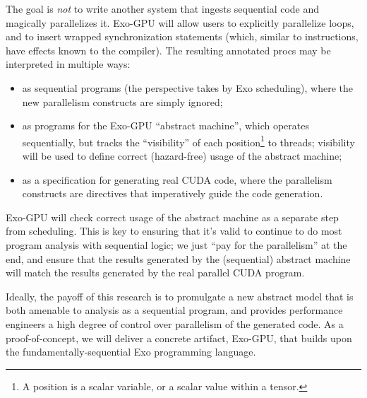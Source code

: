 \filbreak
The goal is \textit{not} to write another system that ingests sequential code and magically parallelizes it.
Exo-GPU will allow users to explicitly parallelize loops, and to insert wrapped synchronization statements (which, similar to instructions, have effects known to the compiler).
The resulting annotated procs may be interpreted in multiple ways:

\begin{itemize}
  \item as sequential programs (the perspective takes by Exo scheduling), where the new parallelism constructs are simply ignored;
  \item as programs for the Exo-GPU ``abstract machine'', which operates sequentially, but tracks the ``visibility'' of each position\footnote{A position is a scalar variable, or a scalar value within a tensor.} to threads;
  visibility will be used to define correct (hazard-free) usage of the abstract machine;
  \item as a specification for generating real CUDA code, where the parallelism constructs are directives that imperatively guide the code generation.
\end{itemize}

\filbreak
Exo-GPU will check correct usage of the abstract machine as a separate step from scheduling.
This is key to ensuring that it's valid to continue to do most program analysis with sequential logic; we just ``pay for the parallelism'' at the end, and ensure that the results generated by the (sequential) abstract machine will match the results generated by the real parallel CUDA program.

\filbreak
Ideally, the payoff of this research is to promulgate a new abstract model that is both amenable to analysis as a sequential program, and provides performance engineers a high degree of control over parallelism of the generated code.
As a proof-of-concept, we will deliver a concrete artifact, Exo-GPU, that builds upon the fundamentally-sequential Exo programming language.


